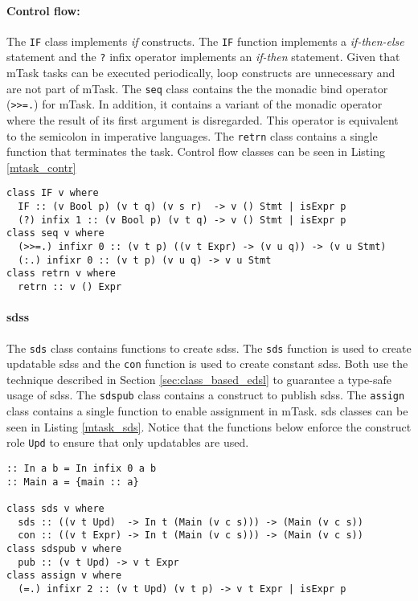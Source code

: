 \paragraph{Control flow:} The \texttt{IF} class implements \textit{if} constructs. The \texttt{IF} function implements a \textit{if-then-else} statement and the \texttt{?} infix operator implements an \textit{if-then} statement. Given that \gls{mTask} tasks can be executed periodically, loop constructs are unnecessary and are not part of \gls{mTask}. The \texttt{seq} class contains the the monadic bind operator (\texttt{>>=.}) for \gls{mTask}. In addition, it contains a variant of the monadic operator where the result of its first argument is disregarded. This operator is equivalent to the semicolon in imperative languages. The \texttt{retrn} class contains a single function that terminates the task. Control flow classes can be seen in Listing \ref{mtask_contr}

\begin{lstlisting}[caption=\gls{mTask} control flow classes,captionpos=b,label=mtask_contr]
class IF v where
  IF :: (v Bool p) (v t q) (v s r)  -> v () Stmt | isExpr p
  (?) infix 1 :: (v Bool p) (v t q) -> v () Stmt | isExpr p
class seq v where
  (>>=.) infixr 0 :: (v t p) ((v t Expr) -> (v u q)) -> (v u Stmt) 
  (:.) infixr 0 :: (v t p) (v u q) -> v u Stmt 
class retrn v where
  retrn :: v () Expr
\end{lstlisting}

\paragraph{\aclp{sds}}\label{sec:sds} The \texttt{sds} class contains functions to create \aclp{sds}. The \texttt{sds} function is used to create updatable \acp{sds} and the \texttt{con} function is used to create constant \acp{sds}. Both use the technique described in Section \ref{sec:class_based_edsl} to guarantee a type-safe usage of \acp{sds}. The \texttt{sdspub} class contains a construct to publish \acp{sds}. The \texttt{assign} class contains a single function to enable assignment in \gls{mTask}. \ac{sds} classes can be seen in Listing \ref{mtask_sds}. Notice that the functions below enforce the construct role \texttt{Upd} to ensure that only updatables are used.

\begin{lstlisting}[caption=\gls{mTask} SDS classes,captionpos=b,label=mtask_sds]
:: In a b = In infix 0 a b
:: Main a = {main :: a}

class sds v where
  sds :: ((v t Upd)  -> In t (Main (v c s))) -> (Main (v c s))
  con :: ((v t Expr) -> In t (Main (v c s))) -> (Main (v c s)) 
class sdspub v where
  pub :: (v t Upd) -> v t Expr
class assign v where
  (=.) infixr 2 :: (v t Upd) (v t p) -> v t Expr | isExpr p
\end{lstlisting}


